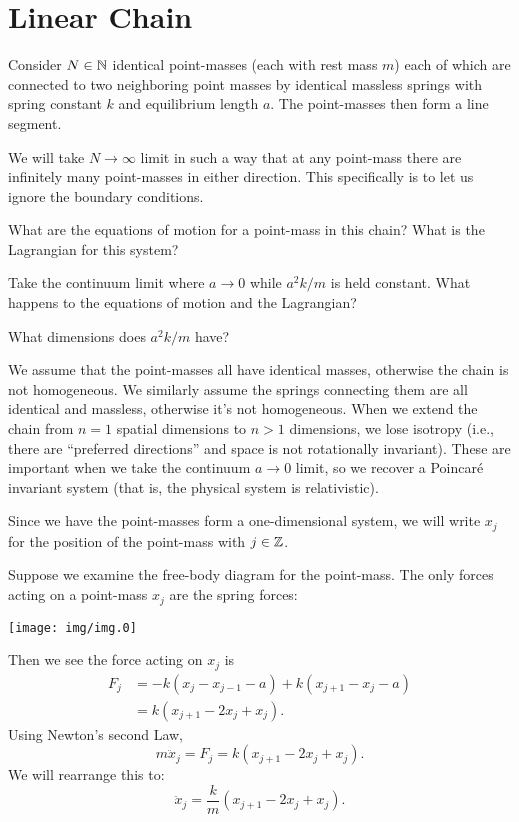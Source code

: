 \section{Linear Chain}

Consider $N\in\mathbb{N}$ identical point-masses (each with rest mass $m$)
each of which are connected to two neighboring point masses by identical
massless springs with spring constant $k$ and equilibrium length $a$.
The point-masses then form a line segment.

We will take $N\to\infty$ limit in such a way that at any point-mass
there are infinitely many point-masses in either direction.
This specifically is to let us ignore the boundary conditions.

What are the equations of motion for a point-mass in this chain? What is
the Lagrangian for this system?

Take the continuum limit where $a\to0$ while $a^{2}k/m$ is held
constant. What happens to the equations of motion and the Lagrangian?

\begin{exercise}
What dimensions does $a^{2}k/m$ have?
\end{exercise}

We assume that the point-masses all have identical masses, otherwise the
chain is not homogeneous. We similarly assume the springs connecting
them are all identical and massless, otherwise it's not
homogeneous. When we extend the chain from $n=1$ spatial dimensions to
$n>1$ dimensions, we lose isotropy (i.e., there are ``preferred directions''
and space is not rotationally invariant).
These are important when we take the continuum $a\to0$ limit, so we
recover a Poincar\'e invariant system (that is, the physical system is
relativistic). 

Since we have the point-masses form a one-dimensional system, we will
write $x_{j}$ for the position of the point-mass with $j\in\mathbb{Z}$.

Suppose we examine the free-body diagram for the point-mass. The only
forces acting on a point-mass $x_{j}$ are the spring forces:
\begin{center}
\texttt{[image: img/img.0]}
\end{center}

Then we see the force acting on $x_{j}$ is
\begin{equation}
\begin{split}
  F_{j} &= -k(x_{j}-x_{j-1}-a) + k(x_{j+1}-x_{j}-a)\\
  &= k(x_{j+1}-2x_{j}+x_{j}).
\end{split}
\end{equation}
Using Newton's second Law,
\begin{equation}
m\ddot{x}_{j} = F_{j} = k(x_{j+1}-2x_{j}+x_{j}).
\end{equation}
We will rearrange this to:
\begin{equation}\label{eq:classical-field-theory:linear-chain:newton-eom}
\ddot{x}_{j} = \frac{k}{m}(x_{j+1}-2x_{j}+x_{j}).
\end{equation}



